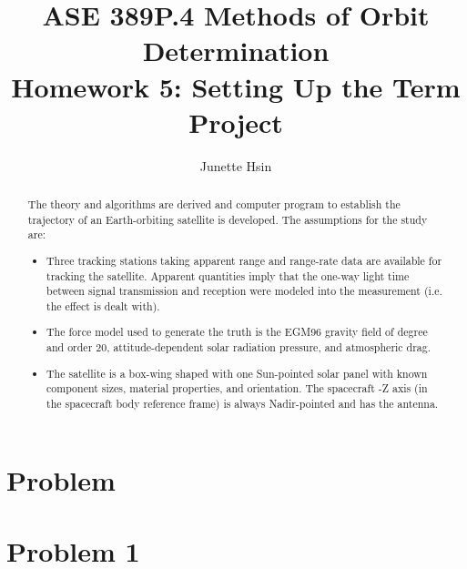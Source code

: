 \documentclass[conf]{new-aiaa}
\title{ASE 389P.4 Methods of Orbit Determination \\ Homework 5: Setting Up the Term Project}
\author{Junette Hsin}
\affil{Masters Student, Aerospace Engineering and Engineering Mechanics, University of Texas, Austin, TX 78712}
\begin{document}
\maketitle

\begin{abstract}
	The theory and algorithms are derived and computer program to establish the trajectory of
	an Earth-orbiting satellite is developed. The assumptions for the study are:
	
	\begin{itemize}
		\item Three tracking stations taking apparent range and range-rate data are available for tracking the	satellite. Apparent quantities imply that the one-way light time between signal transmission and	reception were modeled into the measurement (i.e. the effect is dealt with).
		\item The force model used to generate the truth is the EGM96 gravity field of degree and order 20,
		attitude-dependent solar radiation pressure, and atmospheric drag.
		\item The satellite is a box-wing shaped with one Sun-pointed solar panel with known component sizes, material properties, and orientation. The spacecraft -Z axis (in the spacecraft body reference frame) is always Nadir-pointed and has the antenna.
	\end{itemize}
	

\end{abstract}


\section*{Problem}



\section*{Problem 1}

\end{document}
